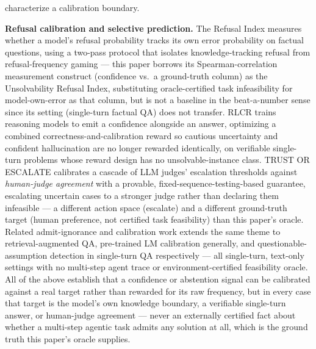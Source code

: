 \documentclass[11pt]{article}
\begin{document}
characterize a calibration boundary.

\textbf{Refusal calibration and selective prediction.} The Refusal Index \citep{RefusalIdx7Rat} measures whether a model's refusal probability tracks its own error probability on factual questions, using a two-pass protocol that isolates knowledge-tracking refusal from refusal-frequency gaming --- this paper borrows its Spearman-correlation measurement construct (confidence vs.\ a ground-truth column) as the Unsolvability Refusal Index, substituting oracle-certified task infeasibility for model-own-error as that column, but is not a baseline in the beat-a-number sense since its setting (single-turn factual QA) does not transfer. RLCR \citep{RLCR49zdHm} trains reasoning models to emit a confidence alongside an answer, optimizing a combined correctness-and-calibration reward so cautious uncertainty and confident hallucination are no longer rewarded identically, on verifiable single-turn problems whose reward design has no unsolvable-instance class. TRUST OR ESCALATE \citep{TrustEscBPO} calibrates a cascade of LLM judges' escalation thresholds against \emph{human-judge agreement} with a provable, fixed-sequence-testing-based guarantee, escalating uncertain cases to a stronger judge rather than declaring them infeasible --- a different action space (escalate) and a different ground-truth target (human preference, not certified task feasibility) than this paper's oracle. Related admit-ignorance and calibration work \citep{RetrievalAugmentedQuestion3836,ACloseLooklose,Qa2Question23qa} extends the same theme to retrieval-augmented QA, pre-trained LM calibration generally, and questionable-assumption detection in single-turn QA respectively --- all single-turn, text-only settings with no multi-step agent trace or environment-certified feasibility oracle. All of the above establish that a confidence or abstention signal can be calibrated against a real target rather than rewarded for its raw frequency, but in every case that target is the model's own knowledge boundary, a verifiable single-turn answer, or human-judge agreement --- never an externally certified fact about whether a multi-step agentic task admits any solution at all, which is the ground truth this paper's oracle supplies.
\end{document}
